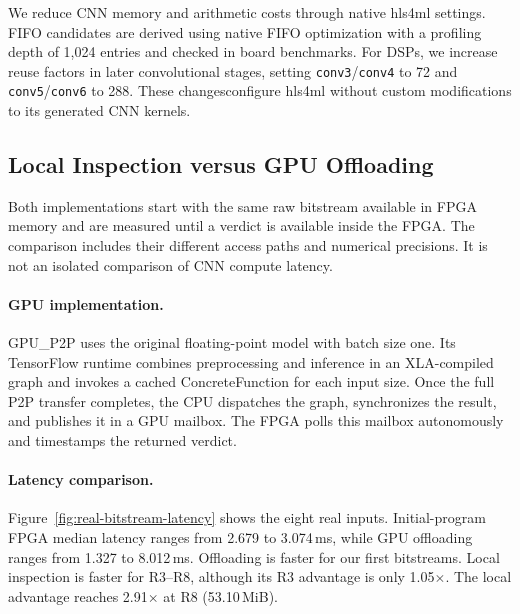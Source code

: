 \documentclass[acmsmall]{acmart}
\begin{document}
We reduce CNN memory and arithmetic costs through native hls4ml settings.
FIFO candidates are derived using native FIFO optimization with a profiling
depth of 1,024 entries and checked in board benchmarks. For DSPs, we increase
reuse factors in later convolutional stages, setting
\texttt{conv3}/\texttt{conv4} to 72 and \texttt{conv5}/\texttt{conv6} to 288.
These changesconfigure hls4ml without custom modifications to its generated CNN kernels.

\subsection{Local Inspection versus GPU Offloading}
\label{sec:eval-gpu}

Both implementations start with the same raw bitstream available in FPGA
memory and are measured until a verdict is available inside the FPGA.
The comparison includes their different access paths and numerical precisions.
It is not an isolated comparison of CNN compute latency.

\paragraph{GPU implementation.}
GPU\_P2P uses the original floating-point model with batch size one. Its TensorFlow
runtime combines preprocessing and inference in an XLA-compiled graph and
invokes a cached ConcreteFunction for each input size. Once the full P2P
transfer completes, the CPU dispatches the graph, synchronizes the result,
and publishes it in a GPU mailbox. The FPGA polls this mailbox
autonomously and timestamps the returned verdict.

\paragraph{Latency comparison.}
Figure~\ref{fig:real-bitstream-latency} shows the eight real inputs. Initial-program
FPGA median latency ranges from 2.679 to 3.074\,ms, while GPU offloading ranges
from 1.327 to 8.012\,ms. Offloading is faster for our first  bitstreams. Local inspection
is faster for R3--R8, although its R3 advantage is only 1.05$\times$. The local
advantage reaches 2.91$\times$ at R8 (53.10\,MiB).
\end{document}
